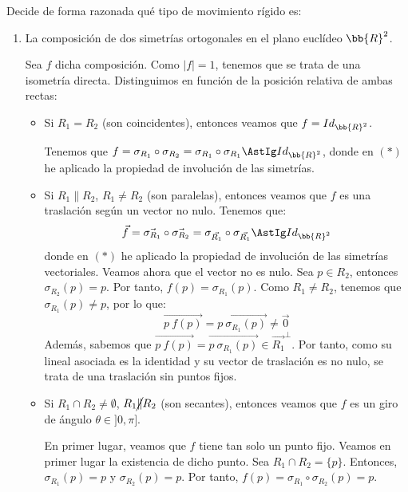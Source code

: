 \begin{ejercicio}
    Decide de forma razonada qué tipo de movimiento rígido es:
    \begin{enumerate}
        \item La composición de dos simetrías ortogonales en el plano euclídeo $\bb{R}^2$.
        
        Sea $f$ dicha composición. Como $|f|=1$, tenemos que se trata de una isometría directa. Distinguimos en función de la posición relativa de ambas rectas:
        \begin{itemize}
            \item Si $R_1=R_2$ (son coincidentes), entonces veamos que $f=Id_{\bb{R}^2}$.
            
            Tenemos que $f=\sigma_{R_1} \circ \sigma_{R_2}=\sigma_{R_1} \circ \sigma_{R_1} \AstIg Id_{\bb{R}^2}$,
            donde en $(\ast)$ he aplicado la propiedad de involución de las simetrías.

            \item Si $R_1 \| R_2$, $R_1 \neq R_2$ (son paralelas), entonces veamos que $f$ es una traslación según un vector no nulo. Tenemos que:
            \begin{equation*}
                \vec{f} = \vec{\sigma_{R_1}} \circ \vec{\sigma_{R_2}} = \sigma_{\vec{R_1}} \circ \sigma_{\vec{R_1}} \AstIg Id_{\bb{R}^2}
            \end{equation*}
            donde en $(\ast)$ he aplicado la propiedad de involución de las simetrías vectoriales. Veamos ahora que el vector no es nulo.
            Sea $p\in R_2$, entonces $\sigma_{R_2}(p)=p$. Por tanto, $f(p)=\sigma_{R_1}(p)$. Como $R_1 \neq R_2$, tenemos que $\sigma_{R_1}(p) \neq p$, por lo que:
            \begin{equation*}
                \vec{p~f(p)} = \vec{p~\sigma_{R_1}(p)} \neq \vec{0}
            \end{equation*}
            Además, sabemos que $\vec{p~f(p)} = \vec{p~\sigma_{R_1}(p)} \in \vec{R_1}^\perp$.
            Por tanto, como su lineal asociada es la identidad y su vector de traslación es no nulo, se trata de una traslación sin puntos fijos.

            \item Si $R_1\cap R_2 \neq \emptyset$, $R_1 \cancel{\|} R_2$ (son secantes), entonces veamos que $f$ es un giro de ángulo $\theta \in ]0, \pi]$.
            
            En primer lugar, veamos que $f$ tiene tan solo un punto fijo. Veamos en primer lugar la existencia de dicho punto.
            Sea $R_1\cap R_2 = \{p\}$. Entonces, $\sigma_{R_1}(p)=p$ y $\sigma_{R_2}(p)=p$. Por tanto, $f(p)=\sigma_{R_1} \circ \sigma_{R_2}(p)=p$.
            

\end{itemize}
\end{enumerate}
\end{ejercicio}

